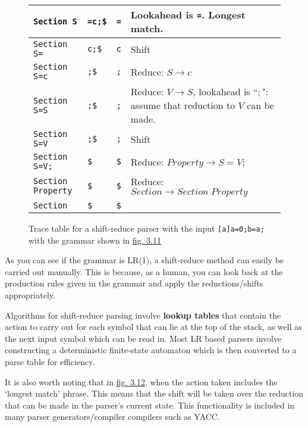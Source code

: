 \begin{figure}[H]
\begin{center}
\begin{tabular}{| m{3.5cm} | m{3cm} | m{2cm} | m{5cm} |}
            \hline
            \verb|Section S| & \verb|=c;$| & \verb|=| & Lookahead is \verb|=|. Longest match.\\
            \hline
            \verb|Section S=| & \verb|c;$| & \verb|c| & Shift\\
            \hline
            \verb|Section S=c| & \verb|;$| & \verb|;| & Reduce: $S \rightarrow c$\\
            \hline
            \verb|Section S=S| & \verb|;$| & \verb|;| & Reduce: $V \rightarrow S$, lookahead is ``$;$": assume that reduction to $V$ can be made.\\
            \hline
            \verb|Section S=V| & \verb|;$| & \verb|;| & Shift\\
            \hline
            \verb|Section S=V;| & \verb|$| & \verb|$| & Reduce: $Property \rightarrow S = V;$\\
            \hline
            \verb|Section Property| & \verb|$| & \verb|$| & Reduce: $Section \rightarrow Section\;Property$\\
            \hline
            \verb|Section| & \verb|$| & \verb|$| & \\
            \hline
        \end{tabular}
    \end{center}
    \cprotect\caption{\label{fig:3.12}Trace table for a shift-reduce parser with the input \verb|[a]a=0;b=a;| with the grammar shown in \hyperref[fig:3.11]{fig. 3.11}}
\end{figure}

As you can see if the grammar is LR(1), a shift-reduce method can easily be carried out manually. This is because, as a human, you can look back at the production rules given in the grammar and apply the reductions/shifts appropriately.

Algorithms for shift-reduce parsing involve \textbf{lookup tables} that contain the action to carry out for each symbol that can lie at the top of the stack, as well as the next input symbol which can be read in. Most LR based parsers involve constructing a deterministic finite-state automaton which is then converted to a parse table for efficiency.\textsuperscript{\cite{hopcroft_motwani_ullman_2006}}

It is also worth noting that in \hyperref[fig:3.12]{fig. 3.12}, when the action taken includes the `longest match' phrase. This means that the shift will be taken over the reduction that can be made in the parser's current state. This functionality is included in many parser generators/compiler compilers such as YACC.

